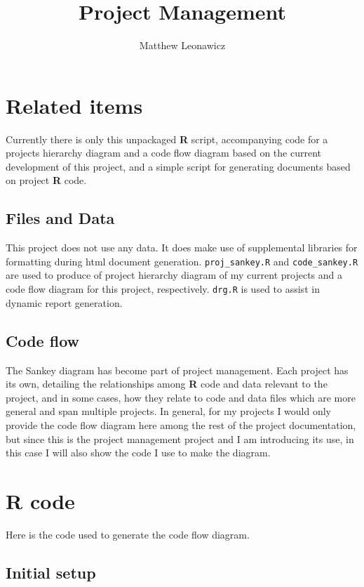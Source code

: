 \documentclass{article}\usepackage[]{graphicx}\usepackage[]{color}
\begin{document}
\title{Project Management}
\author{Matthew Leonawicz}
\maketitle



\section{Related items}
Currently there is only this unpackaged \textbf{R} script, accompanying code for a projects hierarchy diagram
and a code flow diagram based on the current development of this project, and a simple script for generating documents based on project \textbf{R} code.

\subsection{Files and Data}
This project does not use any data.
It does make use of supplemental libraries for formatting during html document generation.
\texttt{proj\_sankey.R} and \texttt{code\_sankey.R} are used to produce of project hierarchy diagram of my current projects and a code flow diagram for this project, respectively.
\texttt{drg.R} is used to assist in dynamic report generation.

\subsection{Code flow}
The Sankey diagram has become part of project management.
Each project has its own, detailing the relationships among \textbf{R} code and data relevant to the project,
and in some cases, how they relate to code and data files which are more general and span multiple projects.
In general, for my projects I would only provide the code flow diagram here among the rest of the project documentation,
but since this is the project management project and I am introducing its use,
in this case I will also show the code I use to make the diagram.



\section{\textbf{R} code}
Here is the code used to generate the code flow diagram.

\subsection{Initial setup}
\end{document}
